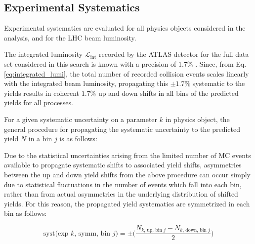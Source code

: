 \subsection{Experimental Systematics}

Experimental systematics are evaluated for all physics objects considered in the analysis, and for the LHC beam luminosity. 

The integrated luminosity \(\mathcal{L}_\text{int}\) recorded by the ATLAS detector for the full data set considered in this search is known with a precision of \(1.7\%\) \cite{ATLAS-CONF-2019-021}. Since, from Eq. \ref{eq:integrated_lumi}, the total number of recorded collision events scales linearly with the integrated beam luminosity, propagating this \(\pm1.7\%\) systematic to the yields results in coherent \(1.7\%\) up and down shifts in all bins of the predicted yields for all processes.

For a given systematic uncertainty on a parameter \(k\) in physics object, the general procedure for propagating the systematic uncertainty to the predicted yield \(N\) in a bin \(j\) is as follows:


\noindent Due to the statistical uncertainties arising from the limited number of MC events available to propagate systematic shifts to associated yield shifts, asymmetries between the up and down yield shifts from the above procedure can occur simply due to statistical fluctuations in the number of events which fall into each bin, rather than from actual asymmetries in the underlying distribution of shifted yields. For this reason, the propagated yield systematics are symmetrized in each bin as follows:

\begin{equation}
\label{eq:exp_systs_symm}
\text{syst}\text{(exp \(k\), symm, bin \(j\))}= \pm\Bigg(\frac{N_\text{\(k\), up, bin \(j\)} - N_\text{\(k\), down, bin \(j\)}}{2}\Bigg)
\end{equation}

